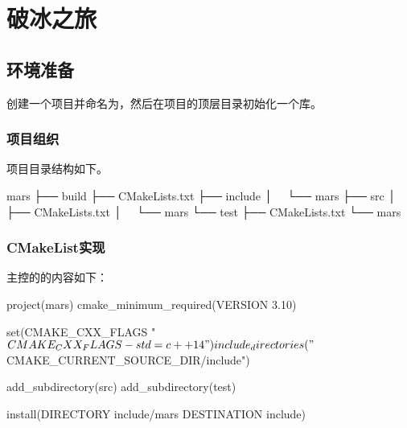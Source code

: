 \section{破冰之旅}

\begin{content}

\subsection{环境准备}

创建一个项目并命名为，然后在项目的顶层目录初始化一个库。

\begin{leftbar}
\end{leftbar}  

\subsubsection{项目组织}

项目目录结构如下。

\begin{leftbar}
 \begin{c++}[caption={\ttfamily{项目组织}}]
mars
├── build
├── CMakeLists.txt
├── include
│   └── mars
├── src
│   ├── CMakeLists.txt
│   └── mars
└── test
    ├── CMakeLists.txt
    └── mars
 \end{c++}
\end{leftbar}

\subsubsection{CMakeList实现}

主控的的内容如下：

\begin{leftbar}
 \begin{c++}[caption={\ttfamily{CMakeLists.txt}}]
project(mars)                                                                                  
cmake_minimum_required(VERSION 3.10)

set(CMAKE_CXX_FLAGS "${CMAKE_CXX_FLAGS} -std=c++14")

include_directories("${CMAKE_CURRENT_SOURCE_DIR}/include")

add_subdirectory(src)
add_subdirectory(test)

install(DIRECTORY include/mars DESTINATION include)
 \end{c++}
\end{leftbar}


\end{content}
